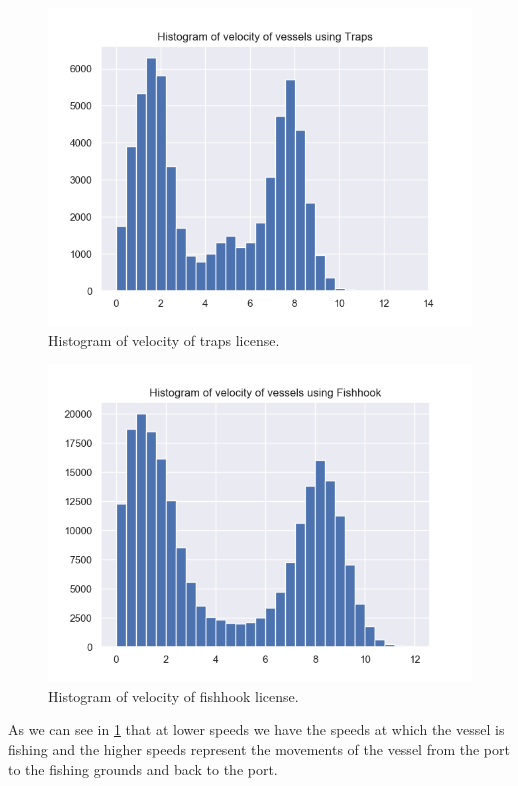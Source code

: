 \begin{figure}[h]
    \centering
    \includegraphics[width=0.8\linewidth]{Chapters/img/h_armadilhas.png}
    \caption{Histogram of velocity of traps license.}
    \label{fig:h_armadilhas}
\end{figure}


\begin{figure}[h]
    \centering
    \includegraphics[width=0.8\linewidth]{Chapters/img/h_linha.png}
    \caption{Histogram of velocity of fishhook license.}
    \label{fig:h_linha}
\end{figure}

As we can see in \ref{fig:h_armadilhas} that at lower speeds we have the speeds at which the vessel is fishing and the higher speeds represent the movements of the vessel from the port to the fishing grounds and back to the port.





